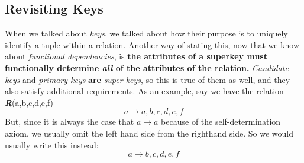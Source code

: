 \documentclass{report}
\begin{document}
\subsection{Revisiting Keys}
When we talked about \textit{keys}, we talked about how their purpose is to uniquely identify a tuple within a relation. Another way of stating this, now that we know about \textit{functional dependencies}, is \textbf{the attributes of a \textbf{superkey} must functionally determine \textit{all} of the attributes of the relation.}
\bigbreak \noindent
\textit{Candidate keys} and \textit{primary keys} \textbf{are} \textit{super keys}, so this is true of them as well, and they also satisfy additional requirements. As an example, say we have the relation \textit{\textbf{R}}(\underline{a},b,c,d,e,f)
$$ a \rightarrow a,b,c,d,e,f$$
But, since it is always the case that $a \rightarrow a$ because of the self-determination axiom, we usually omit the left hand side from the righthand side. So we would usually write this instead:
$$ a \rightarrow b,c,d,e,f$$
\end{document}
